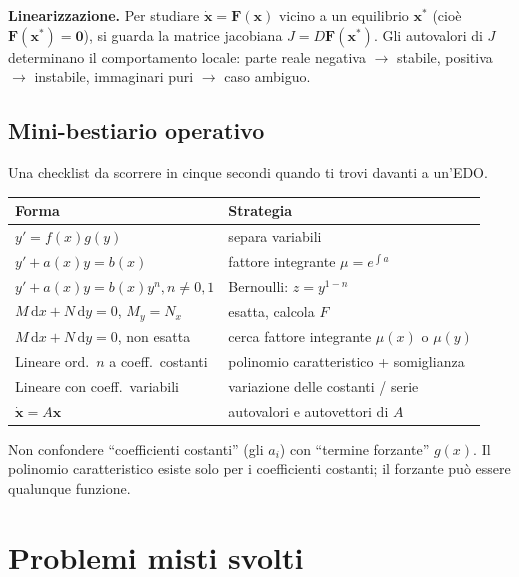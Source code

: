 \documentclass[11pt,a4paper,openany]{book}
\theoremstyle{plain}
\theoremstyle{definition}
\theoremstyle{remark}
\newcommand{\dd}{\,\mathrm{d}}
\renewcommand{\vec}[1]{\mathbf{#1}}
\newcommand{\F}{\mathbf{F}}
\begin{document}
\begin{nota}
\textbf{Linearizzazione.} Per studiare $\dot{\vec{x}}=\F(\vec{x})$ vicino a un
equilibrio $\vec{x}^\ast$ (cio\`e $\F(\vec{x}^\ast)=\vec{0}$), si guarda la
matrice jacobiana $J=D\F(\vec{x}^\ast)$. Gli autovalori di $J$ determinano il
comportamento locale: parte reale negativa $\to$ stabile, positiva $\to$
instabile, immaginari puri $\to$ caso ambiguo.
\end{nota}

\section{Mini-bestiario operativo}

Una checklist da scorrere in cinque secondi quando ti trovi davanti a un'EDO.

\begin{center}
\renewcommand{\arraystretch}{1.25}
\begin{tabular}{|p{6cm}|p{9cm}|}
\hline
\textbf{Forma} & \textbf{Strategia}\\\hline
$y'=f(x)g(y)$ & separa variabili\\\hline
$y'+a(x)y=b(x)$ & fattore integrante $\mu=e^{\int a}$\\\hline
$y'+a(x)y=b(x)y^n,n\ne 0,1$ & Bernoulli: $z=y^{1-n}$\\\hline
$M\dd x+N\dd y=0$, $M_y=N_x$ & esatta, calcola $F$\\\hline
$M\dd x+N\dd y=0$, non esatta & cerca fattore integrante $\mu(x)$ o $\mu(y)$\\\hline
Lineare ord.\ $n$ a coeff.\ costanti & polinomio caratteristico + somiglianza\\\hline
Lineare con coeff.\ variabili & variazione delle costanti / serie\\\hline
$\dot{\vec{x}}=A\vec{x}$ & autovalori e autovettori di $A$\\\hline
\end{tabular}
\end{center}

\begin{trappola}
Non confondere ``coefficienti costanti'' (gli $a_i$) con ``termine forzante''
$g(x)$. Il polinomio caratteristico esiste solo per i coefficienti costanti;
il forzante pu\`o essere qualunque funzione.
\end{trappola}

\chapter{Problemi misti svolti}
\end{document}
